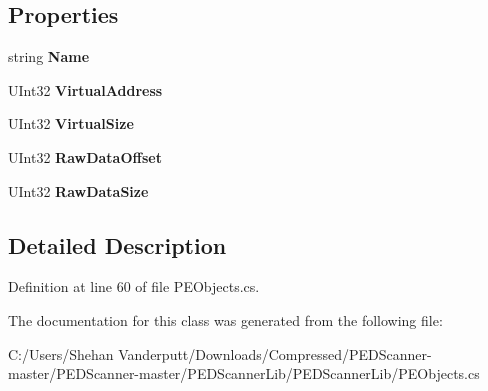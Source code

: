 \subsection*{Properties}
\begin{DoxyCompactItemize}
\item 
\mbox{\label{class_p_e_d_scanner_lib_1_1_objects_1_1_section_object_a263f36ae72b7b0597988040e0dd5ab8d}} 
string {\bfseries Name}
\item 
\mbox{\label{class_p_e_d_scanner_lib_1_1_objects_1_1_section_object_ab06014884a7a6eb7c4dfb3b2a8cbcfbb}} 
U\+Int32 {\bfseries Virtual\+Address}
\item 
\mbox{\label{class_p_e_d_scanner_lib_1_1_objects_1_1_section_object_a4fcd634b61fa0e250c831790c92cc4a0}} 
U\+Int32 {\bfseries Virtual\+Size}
\item 
\mbox{\label{class_p_e_d_scanner_lib_1_1_objects_1_1_section_object_ac69db652ebcecd1da35fcec12cdbce4e}} 
U\+Int32 {\bfseries Raw\+Data\+Offset}
\item 
\mbox{\label{class_p_e_d_scanner_lib_1_1_objects_1_1_section_object_a73d93a5a201eeffdb18e39a6e29251c4}} 
U\+Int32 {\bfseries Raw\+Data\+Size}
\end{DoxyCompactItemize}


\subsection{Detailed Description}


Definition at line 60 of file P\+E\+Objects.\+cs.



The documentation for this class was generated from the following file\+:\begin{DoxyCompactItemize}
\item 
C\+:/\+Users/\+Shehan Vanderputt/\+Downloads/\+Compressed/\+P\+E\+D\+Scanner-\/master/\+P\+E\+D\+Scanner-\/master/\+P\+E\+D\+Scanner\+Lib/\+P\+E\+D\+Scanner\+Lib/P\+E\+Objects.\+cs\end{DoxyCompactItemize}

